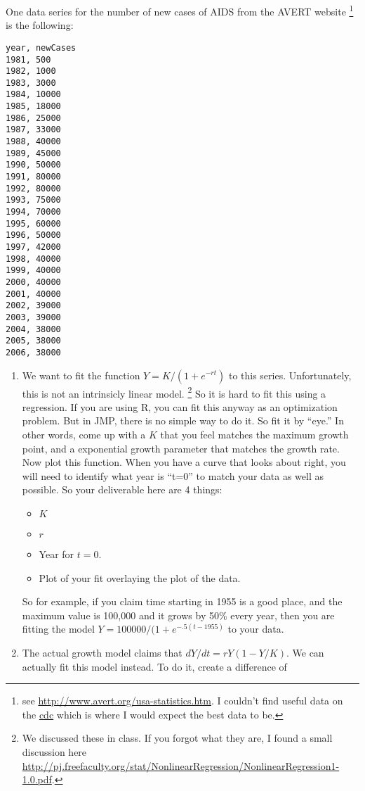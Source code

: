 \documentclass[11pt]{article}
\begin{document}
\begin{enumerate}
One data series for the number of new cases of AIDS from the AVERT
website%
\footnote{see
\href{http://www.avert.org/usa-statistics.htm}{http://www.avert.org/usa-statistics.htm}.
I couldn't find useful data on the
\href{http://www.cdc.gov/Hiv/topics/surveillance/resources/factsheets/incidence.htm}{cdc}
which is where I would expect the best data to be.}
is the following:
\newpage

\begin{verbatim}
year, newCases 
1981, 500
1982, 1000
1983, 3000
1984, 10000
1985, 18000
1986, 25000
1987, 33000
1988, 40000
1989, 45000
1990, 50000
1991, 80000
1992, 80000
1993, 75000
1994, 70000
1995, 60000
1996, 50000
1997, 42000
1998, 40000
1999, 40000
2000, 40000
2001, 40000
2002, 39000
2003, 39000
2004, 38000
2005, 38000
2006, 38000
\end{verbatim}
\begin{enumerate}
\item We want to fit the function $Y = K/(1+e^{-rt})$ to this series.
Unfortunately, this is not an intrinsicly linear model.%
\footnote{We discussed these in class.  If you forgot what they are, I
found a small discussion here \href{http://pj.freefaculty.org/stat/NonlinearRegression/NonlinearRegression1-1.0.pdf}{http://pj.freefaculty.org/stat/NonlinearRegression/NonlinearRegression1-1.0.pdf}.}
So it is hard to fit this using a regression.  If you are using R, you
can fit this anyway as an optimization problem.  But in JMP, there is
no simple way to do it.  So fit it by ``eye.''  In other words, come
up with a $K$ that you feel matches the maximum growth point, and a
exponential growth parameter that matches the growth rate.  Now plot
this function.  When you have a curve that looks about right, you will
need to identify what year is ``t=0'' to match your data as well as
possible.   So your deliverable here are 4 things:
\begin{itemize}
\item $K$
\item $r$
\item Year for $t=0$.
\item Plot of your fit overlaying the plot of the data.
\end{itemize}
So for example, if you claim time starting in 1955 is a good place,
and the maximum value is 100,000 and it grows by 50\% every year, then you
are fitting the model $Y = 100000/(1+e^{-.5(t-1955)}$ to your data.
\item The actual growth model claims that $dY/dt = rY(1 - Y/K)$.  We
can actually fit this model instead.  To do it, create a difference of

\end{enumerate}
\end{enumerate}
\end{document}
